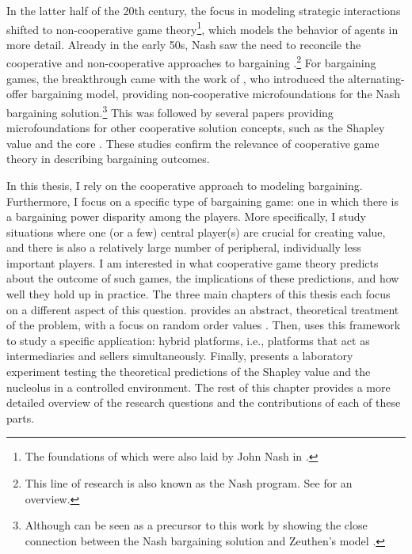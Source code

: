 In the latter half of the 20th century, the focus in modeling strategic interactions shifted to non-cooperative game theory\footnote{
    The foundations of which were also laid by John Nash in \textcite{nash1950non}.
}, which models the behavior of agents in more detail.
Already in the early 50s, Nash saw the need to reconcile the cooperative and non-cooperative approaches to bargaining \parencite{nash1953two}.\footnote{
    This line of research is also known as the Nash program.
    See \textcite{serrano2021sixty} for an overview.
}
For bargaining games, the breakthrough came with the work of \textcite{rubinstein1982perfect}, who introduced the alternating-offer bargaining model, providing non-cooperative microfoundations for the Nash bargaining solution.\footnote{
    Although \textcite{harsanyi1956approaches} can be seen as a precursor to this work by showing the close connection between the Nash bargaining solution \parencite{nash1950bargaining} and Zeuthen's model \parencite{zeuthen1930problems}.
}
This was followed by several papers providing microfoundations for other cooperative solution concepts, such as the Shapley value \parencite[e.g.,][]{gul1989bargaining,winter1994demand,hart1996bargaining,stole1996intra} and the core \parencite[e.g.,][]{serrano1995market}.
These studies confirm the relevance of cooperative game theory in describing bargaining outcomes.

In this thesis, I rely on the cooperative approach to modeling bargaining.
Furthermore, I focus on a specific type of bargaining game: one in which there is a bargaining power disparity among the players.
More specifically, I study situations where one (or a few) central player(s) are crucial for creating value, and there is also a relatively large number of peripheral, individually less important players.
I am interested in what cooperative game theory predicts about the outcome of such games, the implications of these predictions, and how well they hold up in practice.
The three main chapters of this thesis each focus on a different aspect of this question.
 provides an abstract, theoretical treatment of the problem, with a focus on random order values \parencite{weber1988probabilistic}. Then,  uses this framework to study a specific application: hybrid platforms, i.e., platforms that act as intermediaries and sellers simultaneously.
Finally,  presents a laboratory experiment testing the theoretical predictions of the Shapley value and the nucleolus in a controlled environment.
The rest of this chapter provides a more detailed overview of the research questions and the contributions of each of these parts.

